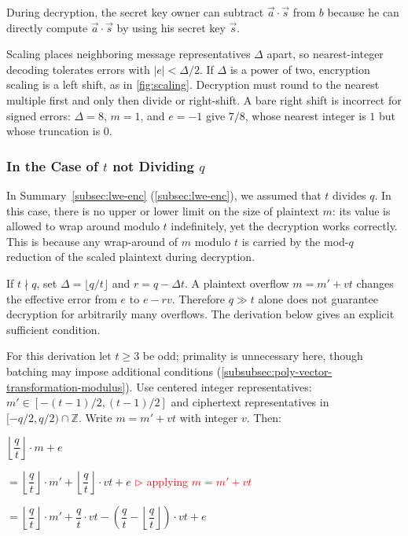 During decryption, the secret key owner can subtract $\vec{a} \cdot \vec{s}$ from $b$ because he can directly compute $\vec{a} \cdot \vec{s}$ by using his secret key $\vec{s}$. 

Scaling places neighboring message representatives $\Delta$ apart, so nearest-integer decoding tolerates errors with $|e|<\Delta/2$. If $\Delta$ is a power of two, encryption scaling is a left shift, as in \autoref{fig:scaling}. Decryption must round to the nearest multiple first and only then divide or right-shift. A bare right shift is incorrect for signed errors: $\Delta=8$, $m=1$, and $e=-1$ give $7/8$, whose nearest integer is $1$ but whose truncation is $0$.

\subsubsection{In the Case of $t$ not Dividing $q$}
\label{subsubsec:lwe-noise-bound}

In Summary~\ref*{subsec:lwe-enc} (\autoref{subsec:lwe-enc}), we assumed that $t$ divides $q$. In this case, there is no upper or lower limit on the size of plaintext $m$: its value is allowed to wrap around modulo $t$ indefinitely, yet the decryption works correctly. This is because any wrap-around of $m$
modulo $t$ is carried by the mod-$q$ reduction of the scaled plaintext during decryption.

If $t\nmid q$, set $\Delta=\lfloor q/t\rfloor$ and $r=q-\Delta t$. A plaintext overflow $m=m'+vt$ changes the effective error from $e$ to $e-rv$. Therefore $q\gg t$ alone does not guarantee decryption for arbitrarily many overflows. The derivation below gives an explicit sufficient condition.

For this derivation let $t\ge3$ be odd; primality is unnecessary here, though batching may impose additional conditions (\autoref{subsubsec:poly-vector-transformation-modulus}). Use centered integer representatives: $m'\in[-(t-1)/2,(t-1)/2]$ and ciphertext representatives in $[-q/2,q/2)\cap\mathbb Z$. Write $m=m'+vt$ with integer $v$. Then:

$\left\lfloor\dfrac{q}{t}\right\rfloor\cdot m + e $

$= \left\lfloor\dfrac{q}{t}\right\rfloor\cdot m' + \left\lfloor\dfrac{q}{t}\right\rfloor\cdot vt + e$   \textcolor{red}{ $\rhd$ applying $m = m' + vt$}

$= \left\lfloor\dfrac{q}{t}\right\rfloor\cdot m' + \dfrac{q}{t}\cdot vt - \left(\dfrac{q}{t} - \left\lfloor\dfrac{q}{t}\right\rfloor\right)\cdot vt + e$  

